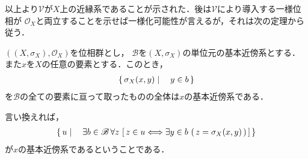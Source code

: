 	以上より$\mathscr{V}$が$X$上の近縁系であることが示された．後は$\mathscr{V}$により導入する一様位相が
	$\mathscr{O}_X$と両立することを示せば一様化可能性が言えるが，それは次の定理から従う．
	
	\begin{screen}
		\begin{thm}[位相群の位相は局所基で決まる]
		\label{thm:topologies_on_topological_groups_are_invariant}
			$\left(\left(X,\sigma_X\right),\mathscr{O}_X\right)$を位相群とし，
			$\mathscr{B}$を$\left(X,\sigma_X\right)$の単位元の基本近傍系とする．また$x$を$X$の任意の要素とする．このとき，
			\begin{align}
				\left\{\, \sigma_X(x,y) \mid \quad y \in b\, \right\}
			\end{align}
			を$\mathscr{B}$の全ての要素に亘って取ったものの全体は$x$の基本近傍系である．
		\end{thm}
	\end{screen}
	
	言い換えれば，
	\begin{align}
		\left\{\, u \mid \quad \exists b \in \mathscr{B}\, 
		\forall z\, \left[\, z \in u \Longleftrightarrow \exists y \in b\, \left(\, z=\sigma_X(x,y)\, \right) \, \right]\, \right\}
	\end{align}
	が$x$の基本近傍系であるということである．
	
